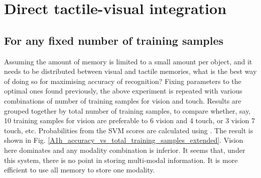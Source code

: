 \documentclass[]{article}
\begin{document}
 \begin{figure}
 	\centering
 	\end{figure}

\section{Direct tactile-visual integration}
\subsection{For any fixed number of training samples}
Assuming the amount of memory is limited to a small amount per object, and it needs to be distributed between visual and tactile memories, what is the best way of doing so for maximising accuracy of recognition?
Fixing parameters to the optimal ones found previously, the above experiment is repeated with various combinations of number of training samples for vision and touch. Results are grouped together by total number of training samples, to compare whether, say, 10 training samples for vision are preferable to 6 vision and 4 touch, or 3 vision 7 touch, etc. 
Probabilities from the SVM scores are calculated using \cite{Platt1999}. The result is shown in Fig. \ref{A1h_accuracy_vs_total_training_samples_extended}. Vision here dominates and any modality combination is inferior. It seems that, under this system, there is no point in storing multi-modal information. It is more efficient to use all memory to store one modality. 
\begin{figure}
	\centering
	\end{figure}
	
\end{document}
